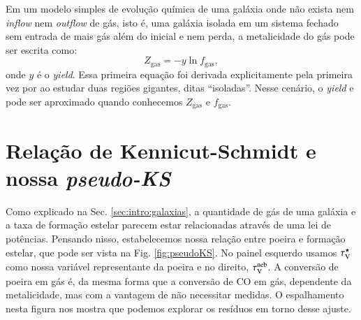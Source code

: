 Em um modelo simples de evolução química de uma galáxia onde não exista nem {\em inflow} nem {\em
outflow} de gás, isto é, uma galáxia isolada em um sistema fechado sem entrada de mais gás além do
inicial e nem perda, a metalicidade do gás pode ser escrita como:
\begin{equation}
	Z_{\mathrm{gas}} = - y \ln f_{\mathrm{gas}},
	\label{eq:Zgas_closedbox}
\end{equation}
\noindent onde $y$ é o {\em yield}. Essa primeira equação foi derivada explicitamente pela primeira
vez por \citet{Searle.Sargent.1972a} ao estudar duas regiões \Hii gigantes, ditas ``isoladas''.
Nesse cenário, o {\em yield} e pode ser aproximado quando conhecemos $Z_{\mathrm{gas}}$ e
$f_{\mathrm{gas}}$.

\section{Relação de Kennicut-Schmidt e nossa {\em pseudo-KS}}
\label{sec:gasfrac:KS}

Como explicado na Sec. \ref{sec:intro:galaxias}, a quantidade de gás de uma galáxia e a taxa de
formação estelar parecem estar relacionadas através de uma lei de potências. Pensando nisso,
estabelecemos nossa relação entre poeira e formação estelar, que pode ser vista na Fig.
\ref{fig:pseudoKS}. No painel esquerdo usamos $\tau_{\mathrm{V}}^\star$ como nossa variável representante da poeira e
no direito, $\tau_{\mathrm{V}}^{\mathrm{neb}}$. A conversão de poeira em gás é, da mesma forma que a conversão de CO em gás,
dependente da metalicidade, mas com a vantagem de não necessitar medidas. O espalhamento nesta
figura nos mostra que podemos explorar os resíduos em torno desse ajuste.

